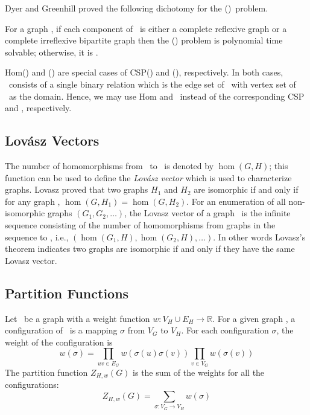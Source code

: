 Dyer and Greenhill proved the following dichotomy for the \chom(\mH)\ problem.
\begin{theorem} 
For a graph \mH, if each component of \mH\ is either a complete reflexive graph
or a complete irreflexive bipartite graph then the \chom(\mH) problem 
is polynomial time solvable; otherwise, it is \cpc\@.
\end{theorem}

Hom(\mH) and \chom(\mH) are special cases of CSP(\mrelset) and \ccsp(\mrelset),
respectively. In both cases, \mrelset\ consists of a single binary relation which is the
edge set of \mH\ with vertex set of \mH\ as the domain.
Hence, we may use Hom and \chom\ instead of
the corresponding CSP and \ccsp, respectively. 

\subsection*{Lov\'{a}sz Vectors}
The number of homomorphisms from \mG\ to \mH\ is denoted by \(\hom(G,H)\); this function
can be used to define the \emph{Lov\'{a}sz vector} which is used to characterize graphs.
Lovasz \cite{lovasz} proved that
two graphs \(H_1\) and \(H_2\) are isomorphic if and only if for any graph \mG,
\(\hom(G,H_1)=\hom(G,H_2)\). 
For an enumeration of all non-isomorphic graphs \((G_1,G_2,\dotsc)\), 
the Lovasz vector of a graph \mH\ is the infinite sequence consisting of the number of
homomorphisms from graphs in the sequence to \mH, i.e.,
\((\hom(G_1,H), \hom(G_2,H), \dotsc)\)\@. 
In other words Lovasz's theorem indicates two graphs are isomorphic if and only if
they have the same Lovasz vector.  
\begin{comment}
Lov\'{a}sz and et al. \cite{propertytesting} used the Lov\'{a}sz vector
for \emph{Edge Reconstruction} problem over graphs with sufficiently many edges, 
They also used Lov\'{a}sz vector in the {\em Property Testing} area.
In this model there is usually a huge graph and at each step only small sample of vertices
can be examined. The goal is to infer parameters of the graph using small samples of it. 
A good example of such a graph one might want to find the properties is the Internet.
\end{comment}

\subsection*{Partition Functions}
Let \mH\ be a graph with a weight function \(w: V_H \cup E_H\to \mathbb{R}\)\@.
For a given graph \mG, a configuration of \mG\ is a mapping \(\sigma\) from \(V_G\) to
\(V_H\). For each configuration \(\sigma\), the weight of the configuration is
\[w(\sigma)=\prod_{uv\in E_G}w(\sigma(u)\sigma(v))\prod_{v\in V_G}w(\sigma(v))\]
The partition function \(Z_{H,w}(G)\) is the sum of the weights for all the configurations:
\[Z_{H,w}(G)=\sum_{\sigma:V_G\to V_H}w(\sigma)\]


